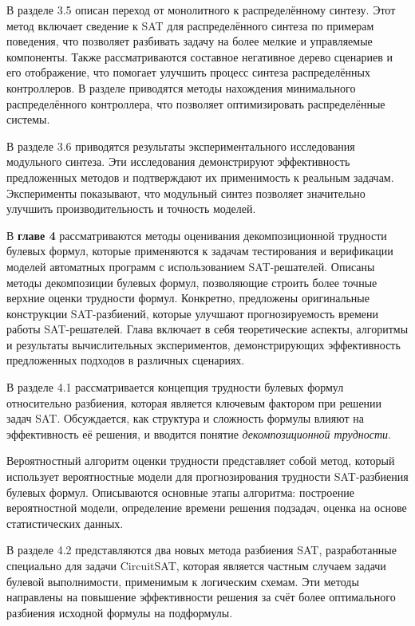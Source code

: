 В разделе 3.5 описан переход от монолитного к распределённому синтезу. Этот метод включает сведение к SAT для распределённого синтеза по примерам поведения, что позволяет разбивать задачу на более мелкие и управляемые компоненты. Также рассматриваются составное негативное дерево сценариев и его отображение, что помогает улучшить процесс синтеза распределённых контроллеров. В разделе приводятся методы нахождения минимального распределённого контроллера, что позволяет оптимизировать распределённые системы.

В разделе 3.6 приводятся результаты экспериментального исследования модульного синтеза. Эти исследования демонстрируют эффективность предложенных методов и подтверждают их применимость к реальным задачам. Эксперименты показывают, что модульный синтез позволяет значительно улучшить производительность и точность моделей.


В \textbf{главе 4} рассматриваются методы оценивания декомпозиционной трудности булевых формул, которые применяются к задачам тестирования и верификации моделей автоматных программ с использованием SAT-решателей.
Описаны методы декомпозиции булевых формул, позволяющие строить более точные верхние оценки трудности формул.
Конкретно, предложены оригинальные конструкции SAT-разбиений, которые улучшают прогнозируемость времени работы SAT-решателей.
Глава включает в себя теоретические аспекты, алгоритмы и результаты вычислительных экспериментов, демонстрирующих эффективность предложенных подходов в различных сценариях.

В разделе 4.1 рассматривается концепция трудности булевых формул относительно разбиения, которая является ключевым фактором при решении задач SAT.
Обсуждается, как структура и сложность формулы влияют на эффективность её решения, и вводится понятие \textit{декомпозиционной трудности}.

Вероятностный алгоритм оценки трудности представляет собой метод, который использует вероятностные модели для прогнозирования трудности SAT-разбиения булевых формул. Описываются основные этапы алгоритма: построение вероятностной модели, определение времени решения подзадач, оценка на основе статистических данных.

В разделе 4.2 представляются два новых метода разбиения SAT, разработанные специально для задачи CircuitSAT, которая является частным случаем задачи булевой выполнимости, применимым к логическим схемам. Эти методы направлены на повышение эффективности решения за счёт более оптимального разбиения исходной формулы на подформулы.

